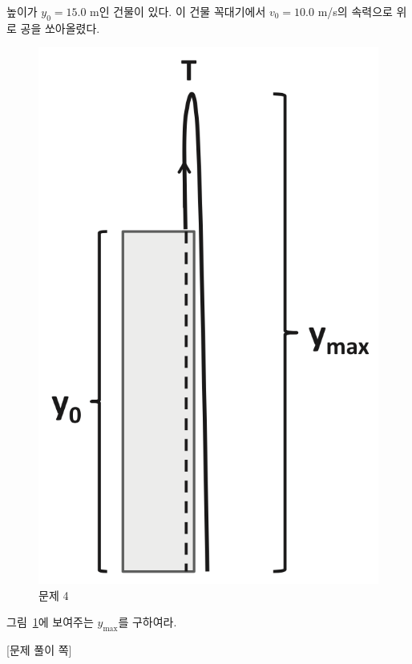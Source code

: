 \documentclass[floatfix,nofootinbib,superscriptaddress,fleqn,preprint]{revtex4}
\begin{document}
 높이가 $y_0=15.0$ m인 건물이 있다. 이 건물
꼭대기에서 $v_0=10.0$ m/s의 속력으로 위로 공을 쏘아올렸다. 
\begin{figure}[ht]
  \centering
\includegraphics[scale=0.5]{Qfig4-4-20210312.png}  
  \caption{문제 4}
  \label{fig:4}
\end{figure}
그림~\ref{fig:4}에 보여주는 $y_{\mathrm{max}}$를 구하여라. 
\newpage

{\color{gray} [문제 풀이 쪽]}

\newpage
\end{document}
